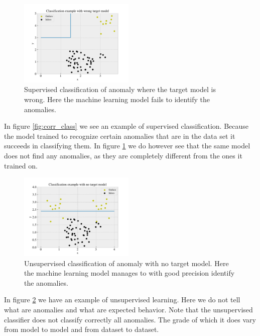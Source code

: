 \documentclass[ reprint, amsmath,amssymb, aps, nofootinbib]{revtex4-2}
\begin{document}
\begin{figure}[H]
    \centering
    \includegraphics[width=0.49\textwidth]{figures/theory/wrong_class.pdf}
    \caption{Supervised classification of anomaly where the target model is wrong. Here the machine learning model fails to identify the anomalies. }
    \label{fig:wrong_class}
\end{figure}

In figure \ref{fig:corr_class} we see an example of supervised classification. Because the model trained to recognize certain anomalies that are in the data set it succeeds in classifying them. In figure \ref{fig:wrong_class} we do however see that the same model does not find any anomalies, as they are completely different from the ones it trained on. 

\begin{figure}[H]
    \centering
    \includegraphics[width=0.49\textwidth]{figures/theory/unsuper.pdf}
    \caption{Unsupervised classification of anomaly with no target model. Here the machine learning model manages to with good precision identify the anomalies. }
    \label{fig:unsup_class}
\end{figure}


In figure \ref{fig:unsup_class} we have an example of unsupervised learning. Here we do not tell what are anomalies and what are expected behavior. Note that the unsupervised classifier does not classify correctly all anomalies. 
The grade of which it does vary from model to model and from dataset to dataset. \par \par 
\end{document}
